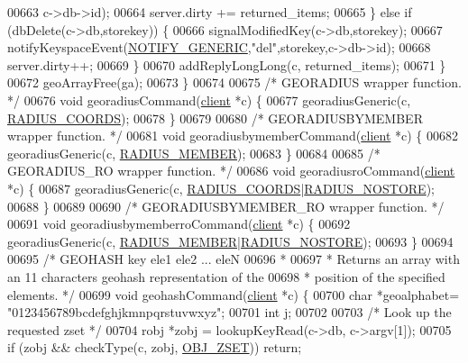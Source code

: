 \begin{DoxyCode}
{{{{{{{{{00663                                 c->db->id);
00664             server.dirty += returned\_items;
00665         \} \textcolor{keywordflow}{else} \textcolor{keywordflow}{if} (dbDelete(c->db,storekey)) \{
00666             signalModifiedKey(c->db,storekey);
00667             notifyKeyspaceEvent(\hyperlink{server_8h_a9fa53dd1068e62365f3964ad3479eec2}{NOTIFY\_GENERIC},\textcolor{stringliteral}{"del"},storekey,c->db->id);
00668             server.dirty++;
00669         \}
00670         addReplyLongLong(c, returned\_items);
00671     \}
00672     geoArrayFree(ga);
00673 \}
00674 
00675 \textcolor{comment}{/* GEORADIUS wrapper function. */}
00676 \textcolor{keywordtype}{void} georadiusCommand(\hyperlink{structclient}{client} *c) \{
00677     georadiusGeneric(c, \hyperlink{geo_8c_a81d5eea6d1e3b777aa5fb123bc0e02a0}{RADIUS\_COORDS});
00678 \}
00679 
00680 \textcolor{comment}{/* GEORADIUSBYMEMBER wrapper function. */}
00681 \textcolor{keywordtype}{void} georadiusbymemberCommand(\hyperlink{structclient}{client} *c) \{
00682     georadiusGeneric(c, \hyperlink{geo_8c_ac9a2d1a380b6e56d2c1dabe19085a9ba}{RADIUS\_MEMBER});
00683 \}
00684 
00685 \textcolor{comment}{/* GEORADIUS\_RO wrapper function. */}
00686 \textcolor{keywordtype}{void} georadiusroCommand(\hyperlink{structclient}{client} *c) \{
00687     georadiusGeneric(c, \hyperlink{geo_8c_a81d5eea6d1e3b777aa5fb123bc0e02a0}{RADIUS\_COORDS}|\hyperlink{geo_8c_a0207f8145c258dfb559a8c0a1c960a2c}{RADIUS\_NOSTORE});
00688 \}
00689 
00690 \textcolor{comment}{/* GEORADIUSBYMEMBER\_RO wrapper function. */}
00691 \textcolor{keywordtype}{void} georadiusbymemberroCommand(\hyperlink{structclient}{client} *c) \{
00692     georadiusGeneric(c, \hyperlink{geo_8c_ac9a2d1a380b6e56d2c1dabe19085a9ba}{RADIUS\_MEMBER}|\hyperlink{geo_8c_a0207f8145c258dfb559a8c0a1c960a2c}{RADIUS\_NOSTORE});
00693 \}
00694 
00695 \textcolor{comment}{/* GEOHASH key ele1 ele2 ... eleN}
00696 \textcolor{comment}{ *}
00697 \textcolor{comment}{ * Returns an array with an 11 characters geohash representation of the}
00698 \textcolor{comment}{ * position of the specified elements. */}
00699 \textcolor{keywordtype}{void} geohashCommand(\hyperlink{structclient}{client} *c) \{
00700     \textcolor{keywordtype}{char} *geoalphabet= \textcolor{stringliteral}{"0123456789bcdefghjkmnpqrstuvwxyz"};
00701     \textcolor{keywordtype}{int} j;
00702 
00703     \textcolor{comment}{/* Look up the requested zset */}
00704     robj *zobj = lookupKeyRead(c->db, c->argv[1]);
00705     \textcolor{keywordflow}{if} (zobj && checkType(c, zobj, \hyperlink{server_8h_a8c356422ddbc03bd77694880a30a1953}{OBJ\_ZSET})) \textcolor{keywordflow}{return};
}}}}}}}}}
\end{DoxyCode}
